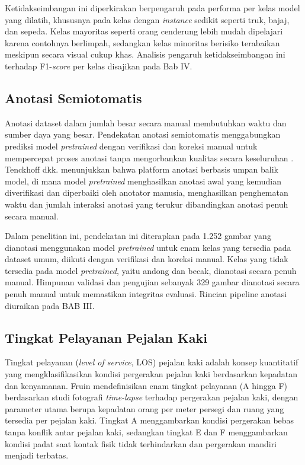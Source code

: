Ketidakseimbangan ini diperkirakan berpengaruh pada performa per kelas model yang dilatih, 
khususnya pada kelas dengan \textit{instance} sedikit seperti truk, bajaj, dan sepeda. 
Kelas mayoritas seperti orang cenderung lebih mudah dipelajari karena contohnya berlimpah, 
sedangkan kelas minoritas berisiko terabaikan meskipun secara visual cukup khas. Analisis 
pengaruh ketidakseimbangan ini terhadap F1-\textit{score} per kelas disajikan pada Bab IV.

\subsection{Anotasi Semiotomatis}

Anotasi dataset dalam jumlah besar secara manual membutuhkan waktu dan sumber daya yang 
besar. Pendekatan anotasi semiotomatis menggabungkan prediksi model \textit{pretrained} 
dengan verifikasi dan koreksi manual untuk mempercepat proses anotasi tanpa mengorbankan 
kualitas secara keseluruhan \cite{tenckhoff2025feedback}. Tenckhoff dkk. menunjukkan 
bahwa platform anotasi berbasis umpan balik model, di mana model \textit{pretrained} 
menghasilkan anotasi awal yang kemudian diverifikasi dan diperbaiki oleh anotator manusia, 
menghasilkan penghematan waktu dan jumlah interaksi anotasi yang terukur dibandingkan 
anotasi penuh secara manual.

Dalam penelitian ini, pendekatan ini diterapkan pada 1.252 gambar yang dianotasi 
menggunakan model \textit{pretrained} untuk enam kelas yang tersedia pada dataset umum, 
diikuti dengan verifikasi dan koreksi manual. Kelas yang tidak tersedia pada model 
\textit{pretrained}, yaitu andong dan becak, dianotasi secara penuh manual. Himpunan 
validasi dan pengujian sebanyak 329 gambar dianotasi secara penuh manual untuk memastikan 
integritas evaluasi. Rincian pipeline anotasi diuraikan pada BAB III.

\subsection{Tingkat Pelayanan Pejalan Kaki}

Tingkat pelayanan (\textit{level of service}, LOS) pejalan kaki adalah konsep kuantitatif 
yang mengklasifikasikan kondisi pergerakan pejalan kaki berdasarkan kepadatan dan 
kenyamanan. Fruin \cite{fruin1971designing} mendefinisikan enam tingkat pelayanan (A hingga 
F) berdasarkan studi fotografi \textit{time-lapse} terhadap pergerakan pejalan kaki, dengan 
parameter utama berupa kepadatan orang per meter persegi dan ruang yang tersedia per pejalan 
kaki. Tingkat A menggambarkan kondisi pergerakan bebas tanpa konflik antar pejalan kaki, 
sedangkan tingkat E dan F menggambarkan kondisi padat saat kontak fisik tidak terhindarkan 
dan pergerakan mandiri menjadi terbatas.

